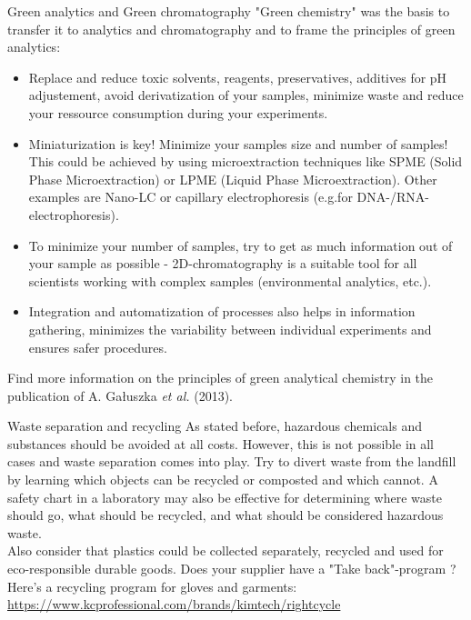 \begin{suggest}{Green analytics and Green chromatography}
	"Green chemistry" was the basis to transfer it to analytics and chromatography and to frame the principles of green analytics:
	\begin{itemize}
		\item Replace and reduce toxic solvents, reagents, preservatives, additives for pH adjustement,  avoid derivatization of your samples, minimize waste  and reduce your ressource consumption during your experiments.
		\item Miniaturization is key! Minimize your samples size and number of samples! This could be achieved by using microextraction techniques like SPME (Solid Phase Microextraction) or LPME (Liquid Phase Microextraction).  Other examples are Nano-LC or capillary electrophoresis (e.g.for DNA-/RNA-electrophoresis).
		\item To minimize your number of samples, try to get as much information out of your sample as possible - 2D-chromatography is a suitable tool for all scientists working with complex samples (environmental analytics, etc.).
		\item Integration and automatization of processes also helps in information gathering, minimizes the variability between individual experiments and ensures safer procedures.
	\end{itemize}
	Find more information on the principles of green analytical chemistry in the publication of A. Gałuszka \textit{et al.} (2013). \cite{green_analytics}
\end{suggest}

\begin{suggest} {Waste separation and recycling}
	As stated before, hazardous chemicals and substances should be avoided at all costs. However, this is not possible in all cases and waste separation comes into play. Try to divert waste from the landfill by learning which objects can be recycled or composted and which cannot. A safety chart in a laboratory may also be effective for determining where waste should go, what should be recycled, and what should be considered hazardous waste. \\
	Also consider that plastics could be collected separately, recycled and used for eco-responsible durable goods. Does your supplier have a "Take back"-program ? Here's a recycling program for gloves and garments: \url{https://www.kcprofessional.com/brands/kimtech/rightcycle}
\end{suggest}	
	

